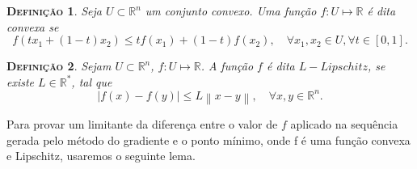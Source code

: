 \documentclass[
	12pt,				%
    oneside,			%
	a4paper,			%
	english,			%
	french,				%
	spanish,			%
	brazil,				%
	]{abntex2}
\newtheorem{definicao}{\scshape Defini\c{c}\~ao}[section]
\newcommand{\norm}[1]{\left\lVert#1\right\rVert}
\begin{document}
        \begin{definicao}
            Seja $U\subset \mathbb{R}^n$ um conjunto convexo. Uma função $f: U \mapsto \mathbb{R}$ é dita convexa se
            \begin{equation*}
                f(tx_1 + (1-t)x_2) \leq tf(x_1) + (1-t)f(x_2), \quad \forall x_1,x_2 \in U,\forall t\in[0,1].
            \end{equation*}
        \end{definicao}

        \begin{definicao}
            Sejam $U \subset \mathbb{R}^n$, $f: U \mapsto \mathbb{R}$. A função $f$ é dita $L-Lipschitz$, se existe $L\in\mathbb{R}^{*}$, tal que
            \begin{equation*}
                |f(x) - f(y)| \leq L\norm{x-y},\quad \forall x,y\in \mathbb{R}^n.
            \end{equation*}
        \end{definicao}
        Para provar um limitante da diferença entre o valor de $f$ aplicado na sequência gerada pelo método do gradiente e o ponto mínimo, onde f é uma função convexa e Lipschitz, usaremos o seguinte lema.
\end{document}
